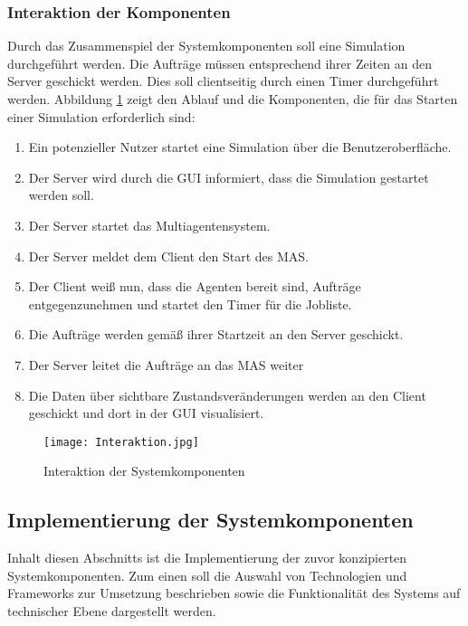\subsubsection{Interaktion der Komponenten} \label{Interaktion der Komponenten}
Durch das Zusammenspiel der Systemkomponenten soll eine Simulation durchgeführt werden. Die Aufträge müssen entsprechend ihrer Zeiten an den Server geschickt werden. Dies soll clientseitig durch einen Timer durchgeführt werden. Abbildung \ref{Int} zeigt den Ablauf und die Komponenten, die für das Starten einer Simulation erforderlich sind: 
\begin{enumerate}
\item Ein potenzieller Nutzer startet eine Simulation über die Benutzeroberfläche.
\item Der Server wird durch die GUI informiert, dass die Simulation gestartet werden soll.
\item Der Server startet das Multiagentensystem.
\item Der Server meldet dem Client den Start des MAS.
\item Der Client weiß nun, dass die Agenten bereit sind, Aufträge entgegenzunehmen und startet den Timer für die Jobliste.
\item Die Aufträge werden gemäß ihrer Startzeit an den Server geschickt.
\item Der Server leitet die Aufträge an das MAS weiter
\item Die Daten über sichtbare Zustandsveränderungen werden an den Client geschickt und dort in der GUI visualisiert.
\end{enumerate}

\begin{figure}[h!]
	\centering
		\texttt{[image: Interaktion.jpg]}        
		\caption{Interaktion der Systemkomponenten}
	\label{Int}
\end{figure}

\newpage
\subsection{Implementierung der Systemkomponenten}
Inhalt diesen Abschnitts ist die Implementierung der zuvor konzipierten Systemkomponenten. Zum einen soll die Auswahl von Technologien und Frameworks zur Umsetzung beschrieben sowie die Funktionalität des Systems auf technischer Ebene dargestellt werden.
